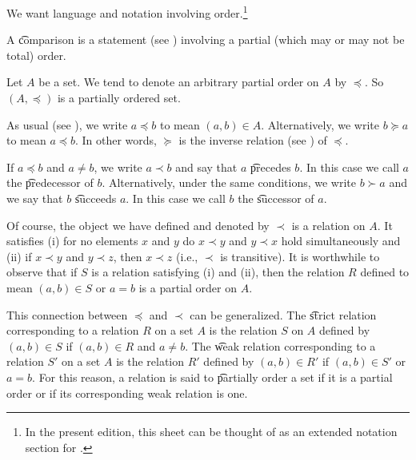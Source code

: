 

We want language and notation involving order.\footnote{In the present edition, this sheet can be thought of as an extended notation section for .}


A \t{comparison} is a statement (see ) involving a partial (which may or may not be total) order.


Let $A$ be a set.
We tend to denote an arbitrary partial order on $A$ by $\preceq$.
So $(A, \preceq)$ is a partially ordered set.

As usual (see ), we write $a \preceq b$ to mean $(a, b) \in A$.
Alternatively, we write $b \succeq a$ to mean $a \preceq b$.
In other words, $\succeq$ is the inverse relation (see ) of $\preceq$.


If $a \preceq b$ and $a \neq b$, we write $a \prec b$ and say that $a$ \t{precedes} $b$. 
In this case we call $a$ the \t{predecessor} of $b$.
Alternatively, under the same conditions, we write $b \succ a$ and we say that $b$ \t{succeeds} $a$.
In this case we call $b$ the \t{successor} of $a$.


Of course, the object we have defined and denoted by $\prec$ is a relation on $A$.
It satisfies (i) for no elements $x$ and $y$ do $x \prec y$ and $y \prec x$ hold simultaneously and (ii) if $x \prec y$ and $y \prec z$, then $x \prec z$ (i.e., $\prec$ is transitive).
It is worthwhile to observe that if $S$ is a relation satisfying (i) and (ii), then the relation $R$ defined to mean $(a, b) \in S$ or $a = b$ is a partial order on $A$.


This connection between $\preceq$ and $\prec$ can be generalized.
The \t{strict relation} corresponding to a relation $R$ on a set $A$ is the relation $S$ on $A$ defined by $(a, b) \in S$ if $(a, b) \in R$ and $a \neq b$.
The \t{weak relation} corresponding to a relation $S'$ on a set $A$ is the relation $R'$ defined by $(a, b) \in R'$ if $(a, b) \in S'$ or $a = b$.
For this reason, a relation is said to \t{partially order} a set if it is a partial order or if its corresponding weak relation is one.



\blankpage
